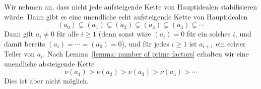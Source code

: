 \subsubsection{}

Wir nehmen an, dass nicht jede aufsteigende Kette von Hauptidealen stabilisieren würde.
Dann gibt es eine unendliche echt aufsteigende Kette von Hauptidealen
\[
              (a_0)
  \subsetneq  (a_1)
  \subsetneq  (a_2)
  \subsetneq  (a_3)
  \subsetneq  (a_4)
  \subsetneq  \dotsb
\]
Dann gilt $a_i \neq 0$ für alle $i \geq 1$ (denn sonst wäre $(a_i) = 0$ für ein solches $i$, und damit bereits $(a_i) = \dotsb = (a_0) = 0$), und für jedes $i \geq 1$ ist $a_{i+1}$ ein echter Teiler von $a_i$.
Nach Lemma~\ref{lemma: number of prime factors} erhalten wir eine unendliche absteigende Kette
\[
    \nu(a_1)
  > \nu(a_2)
  > \nu(a_3)
  > \nu(a_4)
  > \dotsb
\]
Dies ist aber nicht möglich.








